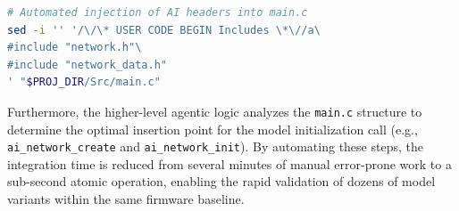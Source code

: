 \begin{lstlisting}[language=bash, caption={Automated code injection using sed.}, label={lst:sed_injection}, mathescape=false]
# Automated injection of AI headers into main.c
sed -i '' '/\/\* USER CODE BEGIN Includes \*\//a\
#include "network.h"\
#include "network_data.h"
' "$PROJ_DIR/Src/main.c"
\end{lstlisting}

Furthermore, the higher-level agentic logic analyzes the \texttt{main.c} structure to determine the optimal insertion point for the model initialization call (e.g., \texttt{ai\_network\_create} and \texttt{ai\_network\_init}). By automating these steps, the integration time is reduced from several minutes of manual error-prone work to a sub-second atomic operation, enabling the rapid validation of dozens of model variants within the same firmware baseline.
